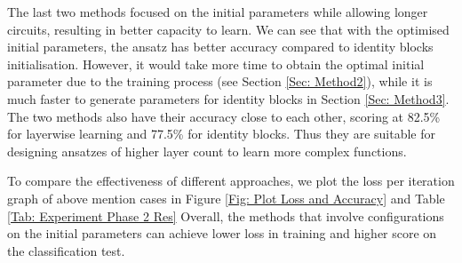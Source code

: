 
The last two methods focused on the initial parameters while allowing longer circuits, resulting in better capacity to learn.
We can see that with the optimised initial parameters, the ansatz has better accuracy compared to identity blocks initialisation.
However, it would take more time to obtain the optimal initial parameter due to the training process (see Section \ref{Sec: Method2}), while it is much faster to generate parameters for identity blocks in Section \ref{Sec: Method3}.
The two methods also have their accuracy close to each other, scoring at 82.5\% for layerwise learning and 77.5\% for identity blocks.
Thus they are suitable for designing ansatzes of higher layer count to learn more complex functions.


To compare the effectiveness of different approaches, we plot the loss per iteration graph of above mention cases in Figure \ref{Fig: Plot Loss and Accuracy} and Table \ref{Tab: Experiment Phase 2 Res}
Overall, the methods that involve configurations on the initial parameters can achieve lower loss in training and higher score on the classification test.

